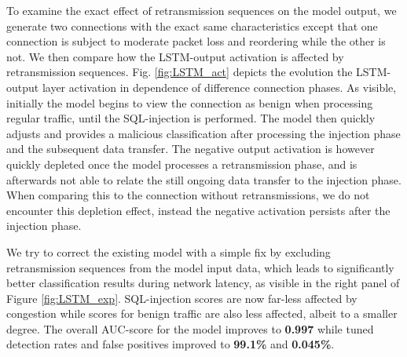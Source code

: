 \documentclass[conference]{IEEEtran}
\begin{document}
To examine the exact effect of retransmission sequences on the model output, we generate two connections with the exact same characteristics except that one connection is subject to moderate packet loss and reordering while the other is not. We then compare how the LSTM-output activation is affected by retransmission sequences. Fig. \ref{fig:LSTM_act} depicts the evolution the LSTM-output layer activation in dependence of difference connection phases. As visible, initially the model begins to view the connection as benign when processing regular traffic, until the SQL-injection is performed. The model then quickly adjusts and provides a malicious classification after processing the injection phase and the subsequent data transfer. The negative output activation is however quickly depleted once the model processes a retransmission phase, and is afterwards not able to relate the still ongoing data transfer to the injection phase. When comparing this to the connection without retransmissions, we do not encounter this depletion effect, instead the negative activation persists after the injection phase.

We try to correct the existing model with a simple fix by excluding retransmission sequences from the model input data, which leads to significantly better classification results during network latency, as visible in the right panel of Figure \ref{fig:LSTM_exp}. SQL-injection scores are now far-less affected by congestion while scores for benign traffic are also less affected, albeit to a smaller degree.
The overall AUC-score for the model improves to \textbf{0.997} while tuned detection rates and false positives improved to \textbf{99.1\%} and \textbf{0.045\%}.





\end{document}
